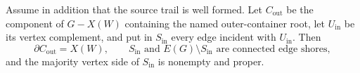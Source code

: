 \begin{corollary}
\label{cor:source-rail-segment-majority-shore}
Assume in addition that the source trail is well formed.  Let
\(C_{\mathrm{out}}\) be the component of \(G-X(W)\) containing the
named outer-container root, let \(U_{\mathrm{in}}\) be its vertex
complement, and put in \(S_{\mathrm{in}}\) every edge incident with
\(U_{\mathrm{in}}\).  Then
\[
 \partial C_{\mathrm{out}}=X(W),\qquad
 S_{\mathrm{in}}\text{ and }E(G)\setminus S_{\mathrm{in}}
 \text{ are connected edge shores},
\]
and the majority vertex side of \(S_{\mathrm{in}}\) is nonempty and
proper.
\end{corollary}

